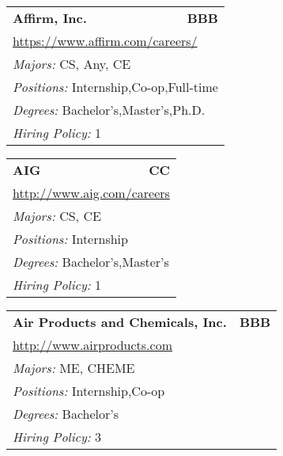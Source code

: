 \documentclass[twoside]{article}
\begin{document}
\begin{center}
\begin{multicols}{3}
\begin{FlushLeft}
\begin{minipage}{.9\columnwidth}
\end{minipage}
 
\begin{minipage}{.9\columnwidth}\begin{tabularx}{.95\columnwidth}{Xr}
                 {\Large\bf Affirm, Inc.} & {\Large\bf BBB}\\
    \multicolumn{2}{p{.95\columnwidth}}{\url{https://www.affirm.com/careers/}}\\
    \multicolumn{2}{p{.95\columnwidth}}{\emph{Majors:} CS, Any, CE}\\
    \multicolumn{2}{p{.95\columnwidth}}{\emph{Positions:} Internship,Co-op,Full-time}\\
    \multicolumn{2}{p{.95\columnwidth}}{\emph{Degrees:} Bachelor's,Master's,Ph.D.}\\
    \multicolumn{2}{p{.95\columnwidth}}{\emph{Hiring Policy:} 1}\\
    \end{tabularx}
    
\end{minipage}
 
\begin{minipage}{.9\columnwidth}\begin{tabularx}{.95\columnwidth}{Xr}
                 {\Large\bf AIG} & {\Large\bf CC}\\
    \multicolumn{2}{p{.95\columnwidth}}{\url{http://www.aig.com/careers}}\\
    \multicolumn{2}{p{.95\columnwidth}}{\emph{Majors:} CS, CE}\\
    \multicolumn{2}{p{.95\columnwidth}}{\emph{Positions:} Internship}\\
    \multicolumn{2}{p{.95\columnwidth}}{\emph{Degrees:} Bachelor's,Master's}\\
    \multicolumn{2}{p{.95\columnwidth}}{\emph{Hiring Policy:} 1}\\
    \end{tabularx}
    
\end{minipage}
 
\begin{minipage}{.9\columnwidth}\begin{tabularx}{.95\columnwidth}{Xr}
                 {\Large\bf Air Products and Chemicals, Inc.} & {\Large\bf BBB}\\
    \multicolumn{2}{p{.95\columnwidth}}{\url{http://www.airproducts.com}}\\
    \multicolumn{2}{p{.95\columnwidth}}{\emph{Majors:} ME, CHEME}\\
    \multicolumn{2}{p{.95\columnwidth}}{\emph{Positions:} Internship,Co-op}\\
    \multicolumn{2}{p{.95\columnwidth}}{\emph{Degrees:} Bachelor's}\\
    \multicolumn{2}{p{.95\columnwidth}}{\emph{Hiring Policy:} 3}\\
    \end{tabularx}
    

\end{minipage}
\end{FlushLeft}
\end{multicols}
\end{center}
\end{document}
